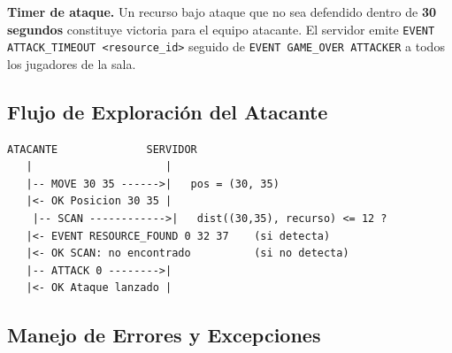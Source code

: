 \documentclass[12pt, letterpaper]{article}
\begin{document}
\begin{nota}
\textbf{Timer de ataque.} Un recurso bajo ataque que no sea defendido dentro de
\textbf{30 segundos} constituye victoria para el equipo atacante. El servidor emite
\texttt{EVENT ATTACK\_TIMEOUT <resource\_id>} seguido de \texttt{EVENT GAME\_OVER ATTACKER}
a todos los jugadores de la sala.
\end{nota}

\subsection{Flujo de Exploración del Atacante}

\begin{lstlisting}
ATACANTE              SERVIDOR
   |                     |
   |-- MOVE 30 35 ------>|   pos = (30, 35)
   |<- OK Posicion 30 35 |
    |-- SCAN ------------>|   dist((30,35), recurso) <= 12 ?
   |<- EVENT RESOURCE_FOUND 0 32 37    (si detecta)
   |<- OK SCAN: no encontrado          (si no detecta)
   |-- ATTACK 0 -------->|
   |<- OK Ataque lanzado |
\end{lstlisting}

\subsection{Manejo de Errores y Excepciones}
\end{document}

